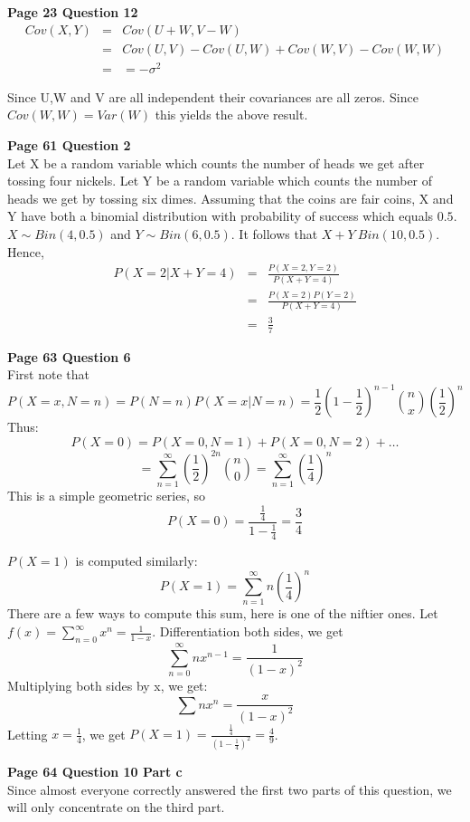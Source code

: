 \documentclass[10pt,a4paper]{article}
\begin{document}
\begin{flushleft}


\textbf{Page 23 Question 12}
\begin{eqnarray*}
Cov(X,Y) &=& Cov(U+W,V-W) \\
&=& Cov(U,V)-Cov(U,W)+Cov(W,V)-Cov(W,W)\\
&=&=-\sigma^2
\end{eqnarray*}

Since U,W and V are all independent their covariances are all
zeros. Since $ Cov(W,W)=Var(W)$ this yields the above result.
\bigskip

\textbf{Page 61 Question 2}\\
 Let X be a random variable which counts the number of heads we get after tossing
 four nickels.
 Let Y be a random variable which counts the number of heads we
 get by tossing six dimes.
 Assuming that the coins are fair coins, X and Y have both a
 binomial distribution with probability of success which equals
 $0.5$. $X\sim Bin(4,0.5)$ and $Y\sim Bin(6,0.5)$.  It follows
 that $X+Y~Bin(10,0.5)$. Hence,
 \begin{eqnarray*}
P(X=2|X+Y=4)&=&\frac{P(X=2,Y=2)}{P(X+Y=4)}\\
&=& \frac{P(X=2)P(Y=2)}{P(X+Y=4)}\\
&=& \frac{3}{7}
 \end{eqnarray*}

\newpage

\textbf{Page 63 Question 6}\\
First note that 
\[P(X=x,N=n)=P(N=n)P(X=x|N=n)=\frac{1}{2}(1-\frac{1}{2})^{n-1}\binom{n}{x}\left(\frac{1}{2}\right)^n\]
Thus:
\[P(X=0)=P(X=0,N=1)+P(X=0,N=2)+\ldots\]
\[= \sum^{\infty}_{n=1}(\frac{1}{2})^{2n}\binom{n}{0}=\sum^{\infty}_{n=1}(\frac{1}{4})^n\]
This is a simple geometric series, so
\[P(X=0)=\frac{\frac{1}{4}}{1-\frac{1}{4}}=\frac{3}{4}\]

$P(X=1)$ is computed similarly:
\[P(X=1)=\sum^{\infty}_{n=1}n(\frac{1}{4})^n\]
There are a few ways to compute this sum, here is one of the niftier ones.  Let $f(x)=\sum^{\infty}_{n=0}x^n=\frac{1}{1-x}$.  Differentiation both sides, we get
\[\sum^{\infty}_{n=0}nx^{n-1}=\frac{1}{(1-x)^2}\]
Multiplying both sides by x, we get:
\[\sum nx^n=\frac{x}{(1-x)^2}\]
Letting $x=\frac{1}{4}$, we get $P(X=1)=\frac{\frac{1}{4}}{(1-\frac{1}{4})^2}=\frac{4}{9}$.
\bigskip



\textbf{Page 64 Question 10 Part c}\\
Since almost everyone correctly answered the first two parts of this
question, we will only concentrate on the third part.


\end{flushleft}
\end{document}
